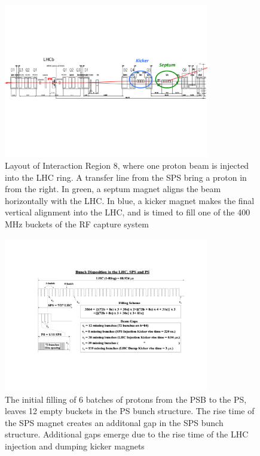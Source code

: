 \begin{figure}[h]
   \centering
  \includegraphics[width=0.8\textwidth]{Figures/LHC_Diagrams/LHC_IR8-layout.pdf}
  \caption{Layout of Interaction Region 8, where one proton beam is
    injected into the LHC ring.  A transfer line from the SPS bring a
    proton in from the right.  In green, a septum magnet aligns the
    beam horizontally with the LHC.  In blue, a kicker magnet makes
    the final vertical alignment into the LHC, and is timed to fill
    one of the 400 MHz buckets of the RF capture
    system} \label{fig:lhc_IR8_layout}
\end{figure}

\begin{figure}[h]
   \centering
  \includegraphics[width=0.8\textwidth]{Figures/LHC_Diagrams/LHC_bunchStructure.pdf}
  \caption{The initial filling of 6 batches of protons from the PSB to
  the PS, leaves 12 empty buckets in the PS bunch structure.  The rise
time of the SPS magnet creates an additonal gap in the SPS bunch
structure.  Additional gaps emerge due to the rise time of the LHC
injection and dumping kicker magnets} \label{fig:lhc_bunchStructure}
\end{figure}

